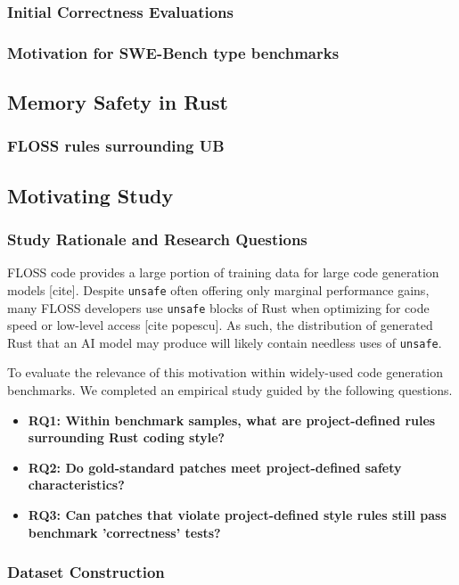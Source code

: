 \documentclass[10pt,conference, anon]{IEEEtran}
\begin{document}
\subsubsection{Initial Correctness Evaluations}
\subsubsection{Motivation for SWE-Bench type benchmarks}
\subsection{Memory Safety in Rust}
\subsubsection{FLOSS rules surrounding UB}

\subsection{Motivating Study}

\subsubsection{Study Rationale and Research Questions}
FLOSS code provides a large portion of training data for large code generation models [cite]. Despite \texttt{unsafe} often offering only marginal performance gains, many FLOSS developers use \texttt{unsafe} blocks of Rust when optimizing for code speed or low-level access [cite popescu]. As such, the distribution of generated Rust that an AI model may produce will likely contain needless uses of \texttt{unsafe}.

To evaluate the relevance of this motivation within widely-used code generation benchmarks. We completed an empirical study guided by the following questions.

\begin{itemize}
	\item \textbf{RQ1: Within benchmark samples, what are project-defined rules surrounding Rust coding style?}
	\item \textbf{RQ2: Do gold-standard patches meet project-defined safety characteristics?}
	\item \textbf{RQ3: Can patches that violate project-defined style rules still pass benchmark 'correctness' tests?}
\end{itemize}

\subsubsection{Dataset Construction}
\end{document}
